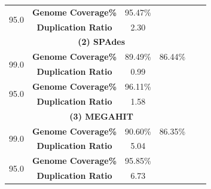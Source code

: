 \begin{table}[h]
\begin{tabular}{|c|c|c|c|c|c|}
\hline
\multirow{2}{*}{95.0}&\textbf{Genome  Coverage\%} &95.47\%&	 &&  \\   
&\textbf{Duplication Ratio} &2.30&	& &  \\   
\hline
\multicolumn{5}{|c|}{ \textbf{(2) SPAdes} }   \\ [0.5ex] %
\hline
\multirow{2}{*}{99.0}&\textbf{Genome Coverage\%}&89.49\% &86.44\%& &\\
&\textbf{Duplication Ratio} &0.99&	 & & \\   
\hline
\multirow{2}{*}{95.0}&\textbf{Genome Coverage\%}& 96.11\% & & &\\
&\textbf{Duplication Ratio} &1.58&	 & & \\   
\hline
\multicolumn{5}{|c|}{ \textbf{(3) MEGAHIT} }    \\ [0.5ex] %
\hline
\multirow{2}{*}{99.0}&\textbf{Genome Coverage\%} &90.60\% &86.35\%&  &\\
&\textbf{Duplication Ratio} &5.04&	 &&  \\   
\hline
\multirow{2}{*}{95.0}&\textbf{Genome Coverage\%} &95.85\% & &  &\\
&\textbf{Duplication Ratio} &6.73&	 &&  \\   
\hline
\end{tabular}
\label{table:coverage-analysis}
\end{table}


